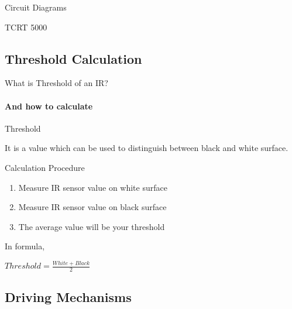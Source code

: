 \documentclass{beamer}
\begin{document}
	\begin{frame} {Circuit Diagrams}
	
	
	
	\begin{alertblock}{TCRT 5000}
	
		
	\end{alertblock}
	
	\end{frame}
	
	\subsection{Threshold Calculation}
	
	\begin{frame}{What is Threshold of an IR?}
	 \framesubtitle{And how to calculate}
	
	\begin{alertblock}{Threshold}
	
	It is a value which can be used to distinguish between black and white surface.
	
	\end{alertblock}
		 
		 \begin{alertblock}{Calculation Procedure}
		 
		 \begin{enumerate}
			
			\item{Measure IR sensor value on white surface}
			
			\item{Measure IR sensor value on black surface}
			
			\item{The average value will be your threshold}		 
		 
		 \end{enumerate}
		 
		 In formula,
		 
		 $Threshold = \frac{White + Black}{2}$
		 
		 \end{alertblock}
	 
	\end{frame}
	
	
	\subsection{Driving Mechanisms}
	
\end{document}
